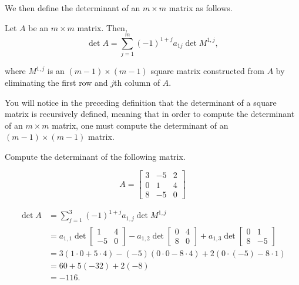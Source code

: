 We then define the determinant of an $m\times m$ matrix as follows. 

{Let $A$ be an $m\times m$ matrix.  Then, 
\[\det A = \sum_{j=1}^m (-1)^{1+j} a_{1j}\det M^{1,j},\]

\noindent where $M^{1,j}$ is an $(m-1)\times (m-1)$ square matrix constructed from $A$ by eliminating the first row and $j$th column of $A$.
}


You will notice in the preceding definition that the determinant of a square matrix is recursively defined, meaning that in order to compute the determinant of an $m\times m$ matrix, one must compute the determinant of an $(m-1)\times (m-1)$ matrix.\\

{Compute the determinant of the following matrix.

\[A = 
\begin{bmatrix}
3 &-5 & 2\\
0 & 1 & 4\\
8 & -5 & 0
\end{bmatrix}
\]
}
{
\begin{align*}
	\det A &= \sum_{j=1}^3 (-1)^{1+j}a_{1,j} \det M^{1,j} \\
				&= a_{1,1}
				\det \begin{bmatrix}
					1 & 4\\
					-5 & 0
				\end{bmatrix}
				- a_{1,2}
				\det \begin{bmatrix}
					0 & 4\\
					8 & 0 
					\end{bmatrix}
				+ a_{1,3}
				\det \begin{bmatrix}
					0 & 1\\
					8 & -5
				\end{bmatrix}\\
				&= 3(1\cdot 0 + 5\cdot 4)- (-5)(0\cdot 0 - 8\cdot 4)+ 2(0\cdot (-5)-8\cdot 1)\\
				& = 60+5(-32)+2(-8)\\
				& = -116.
\end{align*}
}

